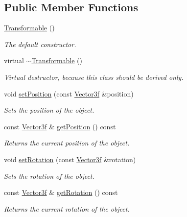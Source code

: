 \subsection*{Public Member Functions}
\begin{DoxyCompactItemize}
\item 
\hyperlink{classburn_1_1_transformable_ab5df8f6f319ebc8888465632a1567981}{Transformable} ()
\begin{DoxyCompactList}\small\item\em The default constructor. \end{DoxyCompactList}\item 
virtual \hyperlink{classburn_1_1_transformable_a421e6dc05fe22e624f25c346380624b7}{$\sim$\-Transformable} ()
\begin{DoxyCompactList}\small\item\em Virtual destructor, because this class should be derived only. \end{DoxyCompactList}\item 
void \hyperlink{classburn_1_1_transformable_a408d484d0ed48c1d7499391b3f2d4a66}{set\-Position} (const \hyperlink{namespaceburn_a9d6d349c94bc4dc9699427216128a0ef}{Vector3f} \&position)
\begin{DoxyCompactList}\small\item\em Sets the position of the object. \end{DoxyCompactList}\item 
const \hyperlink{namespaceburn_a9d6d349c94bc4dc9699427216128a0ef}{Vector3f} \& \hyperlink{classburn_1_1_transformable_ac2946b97405311e3aff7f86fc6b0cd59}{get\-Position} () const 
\begin{DoxyCompactList}\small\item\em Returns the current position of the object. \end{DoxyCompactList}\item 
void \hyperlink{classburn_1_1_transformable_adad877d654e3ac20ed0ff6edf002e040}{set\-Rotation} (const \hyperlink{namespaceburn_a9d6d349c94bc4dc9699427216128a0ef}{Vector3f} \&rotation)
\begin{DoxyCompactList}\small\item\em Sets the rotation of the object. \end{DoxyCompactList}\item 
const \hyperlink{namespaceburn_a9d6d349c94bc4dc9699427216128a0ef}{Vector3f} \& \hyperlink{classburn_1_1_transformable_a14977c0459a9bec1fd935a5967111311}{get\-Rotation} () const 
\begin{DoxyCompactList}\small\item\em Returns the current rotation of the object. \end{DoxyCompactList}\item 

\end{DoxyCompactItemize}

